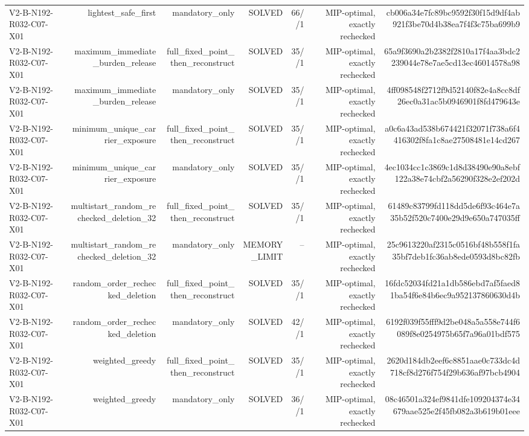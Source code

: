 {\begin{longtable}{lrrrrrr}
V2-B-N192-R032-C07-X01 & lightest\_safe\_first & mandatory\_only & SOLVED & 66//1 & MIP-optimal, exactly rechecked & cb006a34e7fc89bc9592f30f15d9df4ab921f3be70d4b38ea7f4f3c75ba699b9 \\
V2-B-N192-R032-C07-X01 & maximum\_immediate\_burden\_release & full\_fixed\_point\_then\_reconstruct & SOLVED & 35//1 & MIP-optimal, exactly rechecked & 65a9f3690a2b2382f2810a17f4aa3bdc2239044e78e7ae5cd13ec46014578a98 \\
V2-B-N192-R032-C07-X01 & maximum\_immediate\_burden\_release & mandatory\_only & SOLVED & 35//1 & MIP-optimal, exactly rechecked & 4ff098548f2712f9d52140f82e4a8cc8df26ec0a31ac5b0946901f8fd479643e \\
V2-B-N192-R032-C07-X01 & minimum\_unique\_carrier\_exposure & full\_fixed\_point\_then\_reconstruct & SOLVED & 35//1 & MIP-optimal, exactly rechecked & a0c6a43ad538b674421f32071f738a6f4416302f8fa1c8ae27508481e14cd267 \\
V2-B-N192-R032-C07-X01 & minimum\_unique\_carrier\_exposure & mandatory\_only & SOLVED & 35//1 & MIP-optimal, exactly rechecked & 4ec1034cc1c3869c1d8d38490e90a8ebf122a38e74cbf2a56290f328e2ef202d \\
V2-B-N192-R032-C07-X01 & multistart\_random\_rechecked\_deletion\_32 & full\_fixed\_point\_then\_reconstruct & SOLVED & 35//1 & MIP-optimal, exactly rechecked & 61489c83799fd118dd5de6f93c464e7a35b52f520c7400e29d9e650a747035ff \\
V2-B-N192-R032-C07-X01 & multistart\_random\_rechecked\_deletion\_32 & mandatory\_only & MEMORY\_LIMIT & -- & MIP-optimal, exactly rechecked & 25c9613220af2315c0516bf48b558f1fa35bf7deb1fc36ab8ede0593d8bc82fb \\
V2-B-N192-R032-C07-X01 & random\_order\_rechecked\_deletion & full\_fixed\_point\_then\_reconstruct & SOLVED & 35//1 & MIP-optimal, exactly rechecked & 16fdc52034fd21a1db586ebd7af5faed81ba54f6e84b6ec9a952137860630d4b \\
V2-B-N192-R032-C07-X01 & random\_order\_rechecked\_deletion & mandatory\_only & SOLVED & 42//1 & MIP-optimal, exactly rechecked & 6192f039f55fff9d2be048a5a558e744f6089f8e0254975b65f7a96a01bdf575 \\
V2-B-N192-R032-C07-X01 & weighted\_greedy & full\_fixed\_point\_then\_reconstruct & SOLVED & 35//1 & MIP-optimal, exactly rechecked & 2620d184db2eef6c8851aae0c733dc4d718cf8d276f754f29b636af97bcb4904 \\
V2-B-N192-R032-C07-X01 & weighted\_greedy & mandatory\_only & SOLVED & 36//1 & MIP-optimal, exactly rechecked & 08c46501a324ef9841dfe109204374e34679aae525e2f45fb082a3b619b01eee \\

\end{longtable}}
